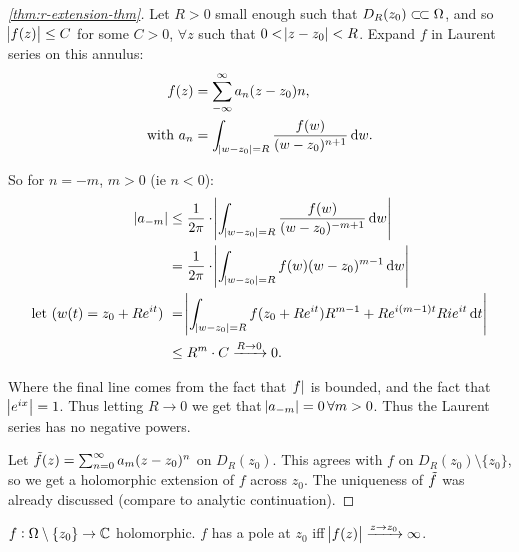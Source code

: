 \begin{proof}[\ref{thm:r-extension-thm}]
Let $R>0$ small enough such that $D_R(z_0) \ssubset \om$, and so $\abs{f(z) } \leq C$ for some $C>0$, $\forall z$ such that $0 < \abs{z-z_0} < R$. Expand $f$ in Laurent series on this annulus:
\begin{align*}
    f(z) &= \sum_{-\infty}^\infty a_n (z-z_0)n,\\
    \text{with } a_n &= \int_{\abs{w-z_0} = R} \frac{f(w)}{(w-z_0)^{n+1}} \dif w.
\end{align*}

So for $n = -m$, $m > 0$ (ie $n<0$):
\begin{align*}
    \abs{a_{-m}} &\leq \frac{1}{2 \pi } \cdot \abs{\int_{\abs{w-z_0} =R} \frac{f(w)}{(w-z_0)^{-m+1}}  \dif w}\\
    &= \frac{1}{2 \pi } \cdot \abs{\int_{\abs{w-z_0} =R} f(w)(w-z_0)^{m-1}  \dif w}\\
    \text{let ($w(t) = z_0 +Re^{it}$) } &= \abs{\int_{\abs{w-z_0} =R} f(z_0 +Re^{it})R^{m-1} +Re^{i(m-1)t} Ri e^{it}  \dif t}\\
    &\leq R^m \cdot C \xrightarrow[]{R\to 0} 0.
\end{align*}

Where the final line comes from the fact that $\abs{f}$ is bounded, and the fact that $\abs{e^{ix}} = 1$. Thus letting $R \to 0$ we get that $\abs{a_{-m}} = 0 \, \forall m>0$. Thus the Laurent series has no negative powers.

Let $\Tilde{f}(z) = \sum_{n=0}^\infty a_m (z-z_0)^n$ on $D_R(z_0)$. This agrees with $f$ on $D_R(z_0) \setminus \{ z_0 \}$, so we get a holomorphic extension of $f$ across $z_0$. The uniqueness of $\Tilde{f}$ was already discussed (compare to analytic continuation).
\end{proof}

\begin{corollary}
$f: \Omega \setminus \{ z_0 \} \to \mathbb{C}$ holomorphic. $f$ has a pole at $z_0$ iff $\abs{f(z)} \xrightarrow[]{z \to z_0} \infty$.
\end{corollary}

